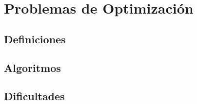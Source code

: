 
\chapter{Problemas de Optimización}

\section{Definiciones}

\section{Algoritmos}

\section{Dificultades}

\endinput
